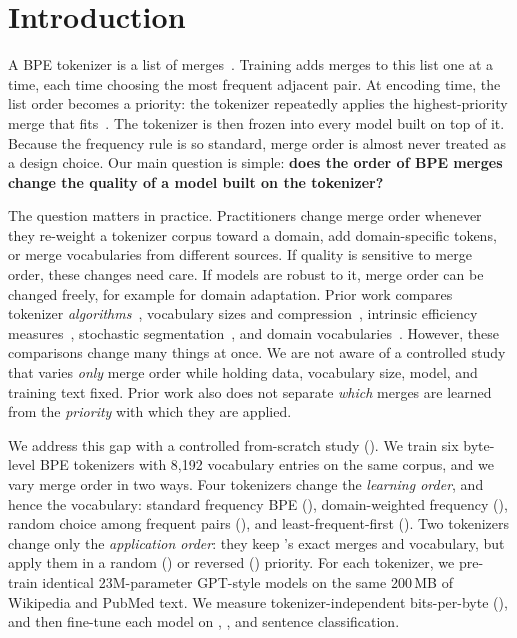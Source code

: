 \section{Introduction}
\label{sec:intro}

A BPE tokenizer is a list of merges~\citep{gage1994new,sennrich2016neural}.
Training adds merges to this list one at a time, each time choosing the most frequent adjacent pair.
At encoding time, the list order becomes a priority: the tokenizer repeatedly applies the highest-priority merge that fits~\citep{radford2019language}.
The tokenizer is then frozen into every model built on top of it.
Because the frequency rule is so standard, merge order is almost never treated as a design choice.
Our main question is simple: {\bf does the order of BPE merges change the quality of a model built on the tokenizer?}

The question matters in practice.
Practitioners change merge order whenever they re-weight a tokenizer corpus toward a domain, add domain-specific tokens, or merge vocabularies from different sources.
If quality is sensitive to merge order, these changes need care.
If models are robust to it, merge order can be changed freely, for example for domain adaptation.
Prior work compares tokenizer \emph{algorithms}~\citep{bostrom2020byte,ali2024tokenizer}, vocabulary sizes and compression~\citep{galle2019investigating,goldman2024unpacking}, intrinsic efficiency measures~\citep{zouhar2023tokenization}, stochastic segmentation~\citep{provilkov2020bpe,kudo2018subword}, and domain vocabularies~\citep{beltagy2019scibert,gu2021domain}.
However, these comparisons change many things at once.
We are not aware of a controlled study that varies \emph{only} merge order while holding data, vocabulary size, model, and training text fixed.
Prior work also does not separate \emph{which} merges are learned from the \emph{priority} with which they are applied.

We address this gap with a controlled from-scratch study ().
We train six byte-level BPE tokenizers with 8,192 vocabulary entries on the same corpus, and we vary merge order in two ways.
Four tokenizers change the \emph{learning order}, and hence the vocabulary:
standard frequency BPE (\freq), domain-weighted frequency (\domain), random choice among frequent pairs (\randlearn), and least-frequent-first (\revlearn).
Two tokenizers change only the \emph{application order}: they keep \freq's exact merges and vocabulary, but apply them in a random (\randorder) or reversed (\revorder) priority.
For each tokenizer, we pre-train identical 23M-parameter GPT-style models on the same 200\,MB of Wikipedia and PubMed text.
We measure tokenizer-independent bits-per-byte (\bpb), and then fine-tune each model on \sst, \agnews, and \pubmedrct sentence classification.

